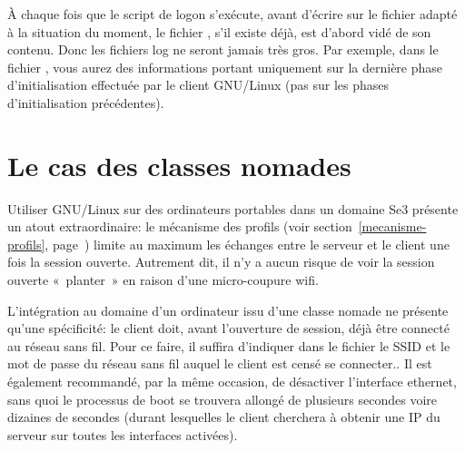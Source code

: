 À chaque fois que le script de logon s'exécute, avant d'écrire
sur le fichier  adapté à la situation du moment,
le fichier , s'il existe déjà,
est d'abord vidé de son contenu. Donc les fichiers log ne seront
jamais très gros. Par exemple, dans le fichier 
, vous aurez des informations
portant uniquement sur la dernière phase d'initialisation effectuée par
le client GNU/Linux (pas sur les phases d'initialisation précédentes).

\section{Le cas des classes nomades}
\label{classes-nomades}

Utiliser GNU/Linux sur des ordinateurs portables dans un domaine Se3 présente un
atout extraordinaire: le mécanisme des profils (voir
section~\ref{mecanisme-profils}, page~\pageref{mecanisme-profils}) limite au
maximum les échanges entre le serveur et le client une fois la session ouverte.
Autrement dit, il n'y a aucun risque de voir la session ouverte «~planter~» en
raison d'une micro-coupure wifi.

L'intégration au domaine d'un ordinateur issu d'une classe nomade ne présente
qu'une spécificité: le client doit, avant l'ouverture de session, déjà être
connecté au réseau sans fil. Pour ce faire, il suffira d'indiquer dans le
fichier  le SSID et le mot de passe du réseau
sans fil auquel le client est censé se connecter.. Il est également recommandé,
par la même occasion, de désactiver l'interface ethernet, sans quoi le processus
de boot se trouvera allongé de plusieurs secondes voire dizaines de secondes
(durant lesquelles le client cherchera à obtenir une IP du serveur sur toutes
les interfaces activées).

